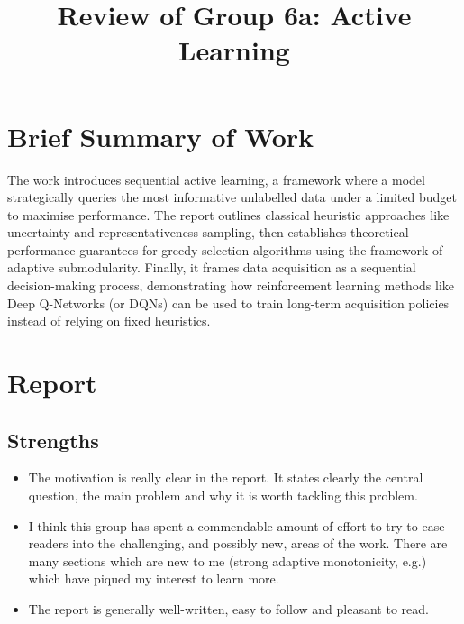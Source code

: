 \documentclass{article}
\title{Review of Group 6a: Active Learning}
\begin{document}
\maketitle
\section{Brief Summary of Work}
The work introduces sequential active learning, a framework where a model strategically queries the most informative unlabelled data under a limited budget to maximise performance. The report outlines classical heuristic approaches like uncertainty and representativeness sampling, then establishes theoretical performance guarantees for greedy selection algorithms using the framework of adaptive submodularity. Finally, it frames data acquisition as a sequential decision-making process, demonstrating how reinforcement learning methods like Deep Q-Networks (or DQNs) can be used to train long-term acquisition policies instead of relying on fixed heuristics.
\section{Report}
\subsection{Strengths}
\begin{itemize}
    \item The motivation is really clear in the report. It states clearly the central question, the main problem and why it is worth tackling this problem.
    \item I think this group has spent a commendable amount of effort to try to ease readers into the challenging, and possibly new, areas of the work. There are many sections which are new to me (strong adaptive monotonicity, e.g.) which have piqued my interest to learn more.
    \item The report is generally well-written, easy to follow and pleasant to read.
\end{itemize}
\end{document}
